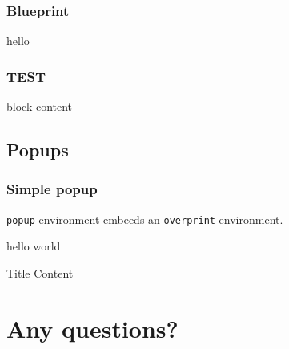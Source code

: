 \documentclass[aspectratio=169]{beamer}
\begin{document}
\begin{blueprintframe}
  \frametitle{Blueprint}
  hello
\end{blueprintframe}


\begin{frame}[fragile,t]
  \frametitle{TEST}
  \begin{block}{block}
    content
  \end{block}
\end{frame}

\subsection{Popups}
\begin{frame}
  \frametitle{Simple popup}
  \texttt{popup} environment embeeds an \texttt{overprint} environment.

  \begin{ffbox}{hello}
    world
  \end{ffbox}



  \begin{popup}{.75}
    \begin{macosbox}{Title}
      Content
    \end{macosbox}
  \end{popup}
\end{frame}

\section{Any questions?}


%   
%   

\end{document}
